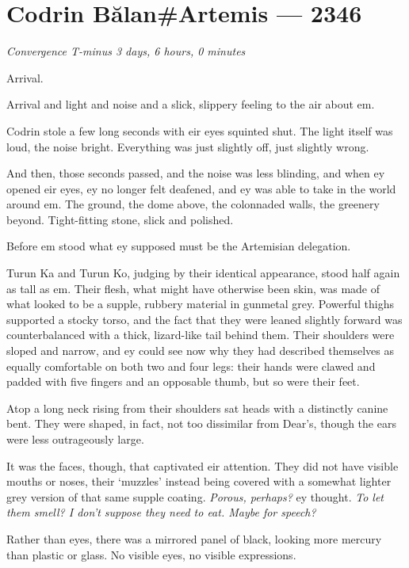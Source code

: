 \hypertarget{codrin-bux103lanartemis-2346}{%
\chapter{Codrin Bălan\#Artemis — 2346}\label{codrin-bux103lanartemis-2346}}

\begin{center}
\emph{Convergence T-minus 3 days, 6 hours, 0 minutes}
\end{center}

\noindent Arrival.

Arrival and light and noise and a slick, slippery feeling to the air about em.

Codrin stole a few long seconds with eir eyes squinted shut. The light itself was loud, the noise bright. Everything was just slightly off, just slightly wrong.

And then, those seconds passed, and the noise was less blinding, and when ey opened eir eyes, ey no longer felt deafened, and ey was able to take in the world around em. The ground, the dome above, the colonnaded walls, the greenery beyond. Tight-fitting stone, slick and polished.

Before em stood what ey supposed must be the Artemisian delegation.

Turun Ka and Turun Ko, judging by their identical appearance, stood half again as tall as em. Their flesh, what might have otherwise been skin, was made of what looked to be a supple, rubbery material in gunmetal grey. Powerful thighs supported a stocky torso, and the fact that they were leaned slightly forward was counterbalanced with a thick, lizard-like tail behind them. Their shoulders were sloped and narrow, and ey could see now why they had described themselves as equally comfortable on both two and four legs: their hands were clawed and padded with five fingers and an opposable thumb, but so were their feet.

Atop a long neck rising from their shoulders sat heads with a distinctly canine bent. They were shaped, in fact, not too dissimilar from Dear's, though the ears were less outrageously large.

It was the faces, though, that captivated eir attention. They did not have visible mouths or noses, their `muzzles' instead being covered with a somewhat lighter grey version of that same supple coating. \emph{Porous, perhaps?} ey thought. \emph{To let them smell? I don't suppose they need to eat. Maybe for speech?}

Rather than eyes, there was a mirrored panel of black, looking more mercury than plastic or glass. No visible eyes, no visible expressions.

